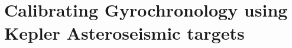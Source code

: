 \newcommand{\prot}{$P_{rot}~$}
\newcommand{\w}{\mathbf{w}}
\newcommand{\wh}{$\hat{\mathbf{w}}_n$}
\newcommand{\ah}{$\hat{A}_n$}
\newcommand{\ph}{$\hat{P}_n$}
\newcommand{\ch}{$\hat{C}_n$}
\newcommand{\gh}{$\hat{G}_n$}
\newcommand{\yh}{$\hat{Y}_n$}
\newcommand{\teffh}{$\hat{T}_n$}
\newcommand{\chit}{$\chi^2$}
\newcommand{\dd}{\ensuremath{\,\mathrm{d}}}
\newcommand{\nastero}{310}
\newcommand{\nprecise}{14~}
\newcommand{\ncluster}{211~}
\newcommand{\nHC}{50~}
\newcommand{\ncooldwarfs}{21~}
\newcommand{\ntotal}{365~}
\newcommand{\ngarcia}{310~}
\newcommand{\subcut}{4.2~}
\newcommand{\gyroa}{0.40}
\newcommand{\aerrp}{0.3}
\newcommand{\aerrm}{0.05}
\newcommand{\gyron}{0.55}
\newcommand{\nerrp}{0.02}
\newcommand{\nerrm}{0.09}
\newcommand{\gyrob}{0.31}
\newcommand{\berrp}{0.05}
\newcommand{\berrm}{0.02}
\newcommand{\U}{8}  %
\newcommand{\V}{2.1}  %
\newcommand{\W}{9.9}  %
\newcommand{\X}{14} %
\newcommand{\Y}{5.0}  %
\newcommand{\Z}{16.1}  %
\newcommand{\Q}{0.14}
\newcommand{\Uerrp}{4}
\newcommand{\Uerrm}{2}
\newcommand{\Verrp}{1}
\newcommand{\Verrm}{0.6}
\newcommand{\Werrp}{0.7}
\newcommand{\Werrm}{0.5}
\newcommand{\Xerr}{4}
\newcommand{\Yerrp}{1}
\newcommand{\Yerrm}{0.8}
\newcommand{\Zerrp}{0.7}
\newcommand{\Zerrm}{0.8}
\newcommand{\Qerrp}{0.06}
\newcommand{\Qerrm}{0.05}

\chapter{Calibrating Gyrochronology using Kepler Asteroseismic targets}
\label{chapter:gyro}




